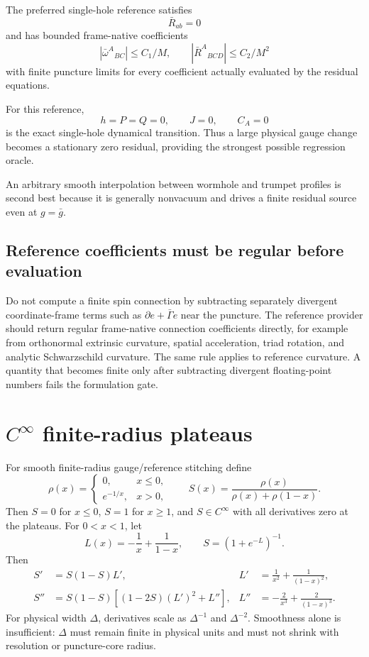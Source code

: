 \documentclass[11pt]{article}
\newcommand{\bg}{\bar g}
\newcommand{\bw}{\bar\omega}
\newcommand{\bR}{\bar R}
\begin{document}
The preferred single-hole reference satisfies
\begin{equation}
\boxed{\bar R_{ab}=0}
\end{equation}
and has bounded frame-native coefficients
\begin{equation}
|\bw^A{}_{BC}|\le C_1/M,\qquad |\bR^A{}_{BCD}|\le C_2/M^2
\label{eq:refbounds}
\end{equation}
with finite puncture limits for every coefficient actually evaluated by the residual equations.

For this reference,
\begin{equation}
\boxed{h=P=Q=0,\qquad J=0,\qquad C_A=0}
\end{equation}
is the exact single-hole dynamical transition. Thus a large physical gauge change becomes a stationary zero residual, providing the strongest possible regression oracle.

An arbitrary smooth interpolation between wormhole and trumpet profiles is second best because it is generally nonvacuum and drives a finite residual source even at $g=\bg$.

\subsection{Reference coefficients must be regular before evaluation}
Do not compute a finite spin connection by subtracting separately divergent coordinate-frame terms such as $\partial e+\bar\Gamma e$ near the puncture. The reference provider should return regular frame-native connection coefficients directly, for example from orthonormal extrinsic curvature, spatial acceleration, triad rotation, and analytic Schwarzschild curvature. The same rule applies to reference curvature. A quantity that becomes finite only after subtracting divergent floating-point numbers fails the formulation gate.

\section{$C^\infty$ finite-radius plateaus}
For smooth finite-radius gauge/reference stitching define
\begin{equation}
\rho(x)=\begin{cases}0,&x\le0,\\ e^{-1/x},&x>0,\end{cases}
\qquad
S(x)=\frac{\rho(x)}{\rho(x)+\rho(1-x)}.
\label{eq:bump}
\end{equation}
Then $S=0$ for $x\le0$, $S=1$ for $x\ge1$, and $S\in C^\infty$ with all derivatives zero at the plateaus. For $0<x<1$, let
\[
L(x)=-\frac1x+\frac1{1-x},\qquad S=(1+e^{-L})^{-1}.
\]
Then
\begin{align}
S'&=S(1-S)L',&L'&=\frac1{x^2}+\frac1{(1-x)^2},\\
S''&=S(1-S)\left[(1-2S)(L')^2+L''\right],&L''&=-\frac2{x^3}+\frac2{(1-x)^3}.
\end{align}
For physical width $\Delta$, derivatives scale as $\Delta^{-1}$ and $\Delta^{-2}$. Smoothness alone is insufficient: $\Delta$ must remain finite in physical units and must not shrink with resolution or puncture-core radius.
\end{document}
